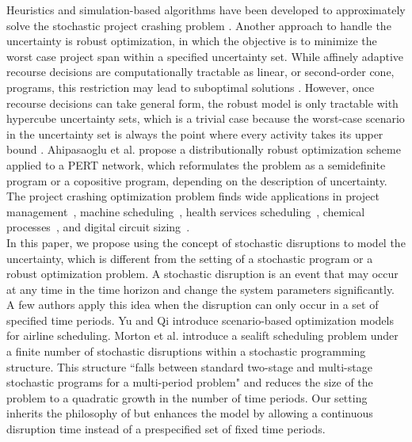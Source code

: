 \documentclass[11pt]{article}
\begin{document}
	Heuristics and simulation-based algorithms have been developed to approximately solve the stochastic project crashing problem \cite{aghaie2009ant, bowman1994stochastic, ke2014genetic, kim2007heuristic}. Another approach to handle the uncertainty is robust optimization, in which the objective is to minimize the worst case project span within a specified uncertainty set. While affinely adaptive recourse decisions are computationally tractable as linear, or second-order cone, programs, this restriction may lead to suboptimal solutions \cite{chen2008linear, cohen2007stochastic}. However, once recourse decisions can take general form, the robust model is only tractable with hypercube uncertainty sets, which is a trivial case because the worst-case scenario in the uncertainty set is always the point where every activity takes its upper bound \cite{wiesemann2012robust}. Ahipasaoglu et al. \cite{ahipasaoglu2016distributionally} propose a distributionally robust optimization scheme applied to a PERT network, which reformulates the problem as a semidefinite program or a copositive program, depending on the description of uncertainty. The project crashing optimization problem finds wide applications in project management~\cite{demeulemeester2006project, jaselskis1991allocation,tonchia2018industrial}, machine scheduling~\cite{blazewicz1983scheduling,hall1996machine}, health services scheduling~\cite{cardoen2010operating}, chemical processes~\cite{li2008process}, and digital circuit sizing~\cite{kim2007heuristic}.\\
	\newline
	In this paper, we propose using the concept of stochastic disruptions to model the uncertainty, which is different from the setting of a stochastic program or a robust optimization problem. A stochastic disruption is an event that may occur at any time in the time horizon and change the system parameters significantly. A few authors apply this idea when the disruption can only occur in a set of specified time periods. Yu and Qi \cite{yu2004disruptionmgt} introduce scenario-based optimization models for airline scheduling. Morton et al. \cite{morton2009sealift} introduce a sealift scheduling problem under a finite number of stochastic disruptions within a stochastic programming structure. This structure ``falls between standard two-stage and multi-stage stochastic programs for a multi-period problem" and reduces the size of the problem to a quadratic growth in the number of time periods. Our setting inherits the philosophy of \cite{morton2009sealift} but enhances the model by allowing a continuous disruption time instead of a prespecified set of fixed time periods. \\
\end{document}
